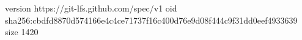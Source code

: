 version https://git-lfs.github.com/spec/v1
oid sha256:cbdfd8870d574166e4c4ce71737f16c400d76e9d08f444c9f31dd0eef4933639
size 1420
